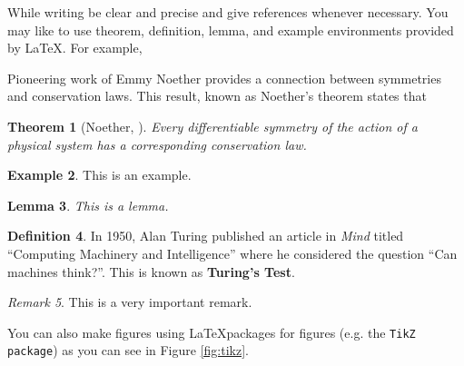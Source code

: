 \documentclass[12pt, a4paper,twoside]{report}
\theoremstyle{plain} %
\newtheorem{theorem}{Theorem}[chapter]
\newtheorem{lemma}[theorem]{Lemma}
\theoremstyle{definition} %
\newtheorem{definition}[theorem]{Definition}
\newtheorem{example}[theorem]{Example}
\theoremstyle{remark} %
\newtheorem{remark}[theorem]{Remark}
\numberwithin{equation}{chapter}
\begin{document}
While writing be clear and precise and give references whenever necessary. You may like to use theorem, definition, lemma, and example environments provided by \LaTeX. For example,

Pioneering work of Emmy Noether \cite{myFirstReference} provides a connection between symmetries and conservation laws. This result, known as Noether's theorem states that

\begin{theorem}[Noether, \cite{myFirstReference}]
Every differentiable symmetry of the action of a physical system has a corresponding conservation law.
\end{theorem}

\begin{example}
This is an example.
\end{example}

\begin{lemma}
This is a lemma.
\end{lemma}

\begin{definition}
In 1950, Alan Turing published an article \cite{bookByTuring} in \textit{Mind} 
titled ``Computing Machinery and Intelligence'' where he considered the question ``Can machines think?''. This is known as {\bf Turing's Test}. 
\end{definition}

\begin{remark}
This is a very important remark. 
\end{remark}

You can also make figures  using \LaTeX packages for figures (e.g. the {\tt TikZ package}) as you can see in Figure \ref{fig:tikz}.
\end{document}
